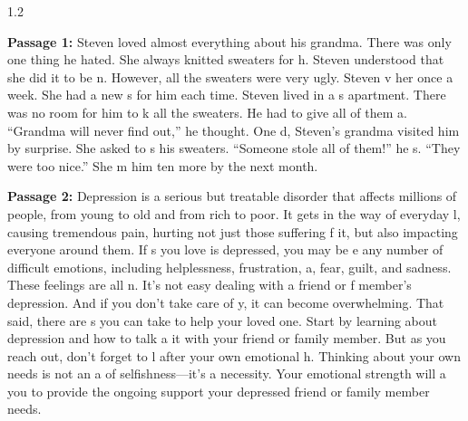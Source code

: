 \vspace{0.5cm}

\begin{spacing}{1.2}

\textbf{Passage 1:} Steven loved almost everything about his grandma. There was only one thing he hated. She always knitted sweaters for h. Steven understood that she did it to be n. However, all the sweaters were very ugly. Steven v her once a week. She had a new s for him each time. Steven lived in a s apartment. There was no room for him to k all the sweaters. He had to give all of them a. “Grandma will never find out,” he thought. One d, Steven's grandma visited him by surprise. She asked to s his sweaters. “Someone stole all of them!” he s. “They were too nice.” She m him ten more by the next month.

\vspace{0.5cm}

\textbf{Passage 2:} Depression is a serious but treatable disorder that affects millions of people, from young to old and from rich to poor. It gets in the way of everyday l, causing tremendous pain, hurting not just those suffering f it, but also impacting everyone around them. If s you love is depressed, you may be e any number of difficult emotions, including helplessness, frustration, a, fear, guilt, and sadness. These feelings are all n. It's not easy dealing with a friend or f member's depression. And if you don't take care of y, it can become overwhelming. That said, there are s you can take to help your loved one. Start by learning about depression and how to talk a it with your friend or family member. But as you reach out, don't forget to l after your own emotional h. Thinking about your own needs is not an a of selfishness---it's a necessity. Your emotional strength will a you to provide the ongoing support your depressed friend or family member needs.

\vspace{0.5cm}


\end{spacing}
